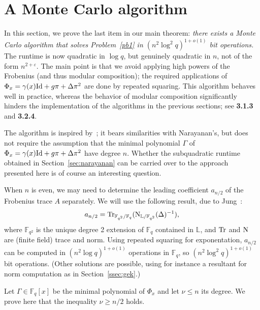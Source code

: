 \documentclass[sigconf]{acmart}
\newcommand{\F}{\mathbb{F}}
\renewcommand{\L}{\mathbb{L}}
\begin{document}

\section{A Monte Carlo algorithm}\label{sec:mc}

In this section, we prove the last item in our main theorem: {\em
  there exists a Monte Carlo algorithm that solves Problem~\ref{pb1}
  in $(n^2 \log^2 q)^{1+o(1)}$ bit operations.} The runtime is now
quadratic in $\log q$, but genuinely quadratic in $n$, not of the form
$n^{2+\varepsilon}$. The main point is that we avoid applying high
powers of the Frobenius (and thus modular composition); the required
applications of $\Phi_x= \gamma(x){\rm Id} + g \pi + \Delta \pi^2$ are
done by repeated squaring.  This algorithm behaves well in practice,
whereas the behavior of modular composition significantly
hinders the implementation of the algorithms in the previous sections;
see {\bf 3.1.3} and {\bf 3.2.4}.

The algorithm is inspired by~\cite[Th.~5]{Shoup94}; it bears
similarities with Narayanan's, but does not require the assumption
that the minimal polynomial $\Gamma$ of $\Phi_x= \gamma(x){\rm Id} + g \pi + \Delta \pi^2$ have degree
$n$. Whether the subquadratic runtime obtained in
Section~\ref{sec:narayanan} can be carried over to the approach
presented here is of course an interesting question.

\smallskip{} When $n$ is even, we may need to
determine the leading coefficient $a_{n/2}$ of the Frobenius trace $A$
separately. We will use the following result, due to
Jung~\cite{Jung00,frobdist}:
\[a_{n/2} = {\rm Tr}_{\F_{q^2}/\F_{q}}({\rm N}_{\L/\F_{q^2}}(\Delta)^{-1}),\]
where $\F_{q^2}$ is the unique degree 2 extension of $\F_q$ contained
in $\L$, and ${\rm Tr}$ and ${\rm N}$ are (finite field) trace and
norm. Using repeated squaring for exponentation, $a_{n/2}$ can be
computed in $(n^2 \log q)^{1+o(1)}$ operations in $\F_q$, so $(n^2
  \log^2 q)^{1+o(1)}$ bit operations.
(Other solutions are possible, using for instance a resultant
 for norm computation as in Section~\ref{ssec:gek}.)

\smallskip{} Let $\Gamma \in \F_q[x]$ be the minimal
polynomial of $\Phi_x$ and let $\nu \le n$ its degree. We prove here 
that the inequality $\nu\ge n/2$ holds.
\end{document}
